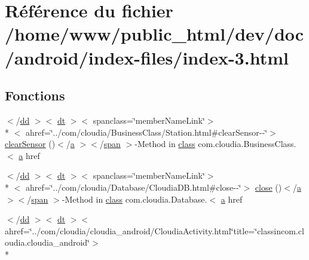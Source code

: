 \hypertarget{index-3_8html}{\section{Référence du fichier /home/www/public\-\_\-html/dev/doc/android/index-\/files/index-\/3.html}
\label{index-3_8html}
}
\subsection*{Fonctions}
\begin{DoxyCompactItemize}
\item 
$<$/\hyperlink{stylesheet_8css_a47f4718a86835a7771ec592ece845221}{dd} $>$$<$ \hyperlink{stylesheet_8css_a107565fb4039d33b041380d6e0ea1d80}{dt} $>$$<$ spanclass=\char`\"{}member\-Name\-Link\char`\"{}$>$\\*
$<$ ahref=\char`\"{}../com/cloudia/Business\-Class/Station.\-html\#clear\-Sensor-\/-\/\char`\"{}$>$ \hyperlink{index-3_8html_adb079e61e9bdb3d2b9b8d1ce6dacf855}{clear\-Sensor} ()$<$/\hyperlink{style_8css_a5e8981582017bb8b84c21f148345d1f7}{a} $>$$<$/\hyperlink{stylesheet_8css_a8343996ebcf16220b04e54659aac31cc}{span} $>$-\/Method in \hyperlink{_tools_8html_acf06f836132665ba8114f5a414c2403f}{class} com.\-cloudia.\-Business\-Class.$<$ \hyperlink{style_8css_a5e8981582017bb8b84c21f148345d1f7}{a} href
\item 
$<$/\hyperlink{stylesheet_8css_a47f4718a86835a7771ec592ece845221}{dd} $>$$<$ \hyperlink{stylesheet_8css_a107565fb4039d33b041380d6e0ea1d80}{dt} $>$$<$ spanclass=\char`\"{}member\-Name\-Link\char`\"{}$>$\\*
$<$ ahref=\char`\"{}../com/cloudia/Database/Cloudia\-D\-B.\-html\#close-\/-\/\char`\"{}$>$ \hyperlink{index-3_8html_a92dfa11a0151a89a031325214d44f705}{close} ()$<$/\hyperlink{style_8css_a5e8981582017bb8b84c21f148345d1f7}{a} $>$$<$/\hyperlink{stylesheet_8css_a8343996ebcf16220b04e54659aac31cc}{span} $>$-\/Method in \hyperlink{_tools_8html_acf06f836132665ba8114f5a414c2403f}{class} com.\-cloudia.\-Database.$<$ \hyperlink{style_8css_a5e8981582017bb8b84c21f148345d1f7}{a} href
\item 
$<$/\hyperlink{stylesheet_8css_a47f4718a86835a7771ec592ece845221}{dd} $>$$<$ \hyperlink{stylesheet_8css_a107565fb4039d33b041380d6e0ea1d80}{dt} $>$$<$ ahref=\char`\"{}../com/cloudia/cloudia\-\_\-android/Cloudia\-Activity.\-html\char`\"{}title=\char`\"{}classincom.\-cloudia.\-cloudia\-\_\-android\char`\"{}$>$\\*

\end{DoxyCompactItemize}
